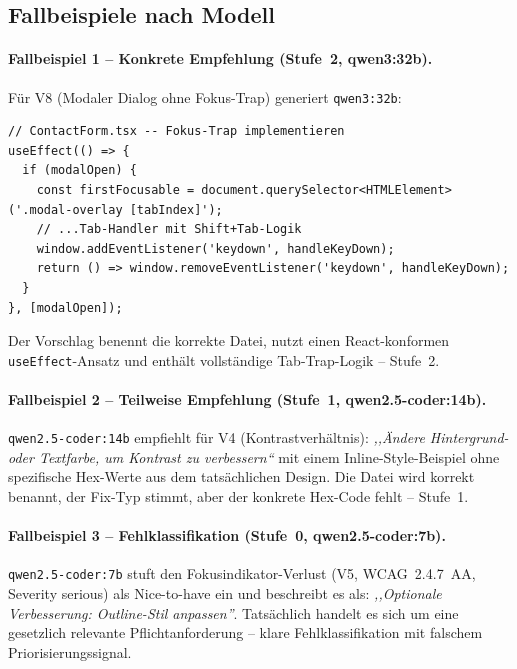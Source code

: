 \subsection{Fallbeispiele nach Modell}
\label{sec:fix_fallbeispiele}

\paragraph{Fallbeispiel 1 -- Konkrete Empfehlung (Stufe~2, qwen3:32b).}
Für V8 (Modaler Dialog ohne Fokus-Trap) generiert \texttt{qwen3:32b}:

\begin{lstlisting}[language={}, basicstyle=\ttfamily\scriptsize, breaklines=true]
// ContactForm.tsx -- Fokus-Trap implementieren
useEffect(() => {
  if (modalOpen) {
    const firstFocusable = document.querySelector<HTMLElement>('.modal-overlay [tabIndex]');
    // ...Tab-Handler mit Shift+Tab-Logik
    window.addEventListener('keydown', handleKeyDown);
    return () => window.removeEventListener('keydown', handleKeyDown);
  }
}, [modalOpen]);
\end{lstlisting}

Der Vorschlag benennt die korrekte Datei, nutzt einen React-konformen \texttt{useEffect}-Ansatz und enthält vollständige Tab-Trap-Logik -- Stufe~2.

\paragraph{Fallbeispiel 2 -- Teilweise Empfehlung (Stufe~1, qwen2.5-coder:14b).}
\texttt{qwen2.5-coder:14b} empfiehlt für V4 (Kontrastverhältnis): \textit{,,Ändere Hintergrund- oder Textfarbe, um Kontrast zu verbessern``} mit einem Inline-Style-Beispiel ohne spezifische Hex-Werte aus dem tatsächlichen Design. Die Datei wird korrekt benannt, der Fix-Typ stimmt, aber der konkrete Hex-Code fehlt -- Stufe~1.

\paragraph{Fallbeispiel 3 -- Fehlklassifikation (Stufe~0, qwen2.5-coder:7b).}
\texttt{qwen2.5-coder:7b} stuft den Fokusindikator-Verlust (V5, \ac{WCAG}~2.4.7~AA, Severity serious) als Nice-to-have ein und beschreibt es als: \textit{,,Optionale Verbesserung: Outline-Stil anpassen''}. Tatsächlich handelt es sich um eine gesetzlich relevante Pflichtanforderung -- klare Fehlklassifikation mit falschem Priorisierungssignal.

